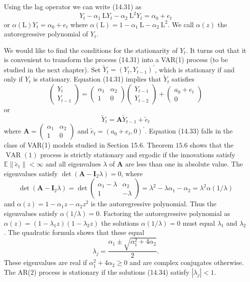 \documentclass[10pt]{article}
\begin{document}
Using the lag operator we can write (14.31) as
$$
Y_{t}-\alpha_{1} \mathrm{~L} Y_{t}-\alpha_{2} \mathrm{~L}^{2} Y_{t}=\alpha_{0}+e_{t}
$$
or $\alpha(\mathrm{L}) Y_{t}=\alpha_{0}+e_{t}$ where $\alpha(\mathrm{L})=1-\alpha_{1} \mathrm{~L}-\alpha_{2} \mathrm{~L}^{2}$. We call $\alpha(z)$ the autoregressive polynomial of $Y_{t}$.

We would like to find the conditions for the stationarity of $Y_{t}$. It turns out that it is convenient to transform the process (14.31) into a VAR(1) process (to be studied in the next chapter). Set $\widetilde{Y}_{t}=\left(Y_{t}, Y_{t-1}\right)^{\prime}$, which is stationary if and only if $Y_{t}$ is stationary. Equation (14.31) implies that $\widetilde{Y}_{t}$ satisfies
$$
\left(\begin{array}{c}
Y_{t} \\
Y_{t-1}
\end{array}\right)=\left(\begin{array}{cc}
\alpha_{1} & \alpha_{2} \\
1 & 0
\end{array}\right)\left(\begin{array}{c}
Y_{t-1} \\
Y_{t-2}
\end{array}\right)+\left(\begin{array}{c}
a_{0}+e_{t} \\
0
\end{array}\right)
$$
or
$$
\widetilde{Y}_{t}=\boldsymbol{A} \widetilde{Y}_{t-1}+\widetilde{e}_{t}
$$
where $\boldsymbol{A}=\left(\begin{array}{cc}\alpha_{1} & \alpha_{2} \\ 1 & 0\end{array}\right)$ and $\widetilde{e}_{t}=\left(a_{0}+e_{t}, 0\right)^{\prime}$. Equation (14.33) falls in the class of VAR(1) models studied in Section 15.6. Theorem $15.6$ shows that the $\operatorname{VAR}(1)$ process is strictly stationary and ergodic if the innovations satisfy $\mathbb{E}\left\|\widetilde{e}_{t}\right\|<\infty$ and all eigenvalues $\lambda$ of $\boldsymbol{A}$ are less than one in absolute value. The eigenvalues satisfy $\operatorname{det}\left(\boldsymbol{A}-\boldsymbol{I}_{2} \lambda\right)=0$, where
$$
\operatorname{det}\left(\boldsymbol{A}-\boldsymbol{I}_{2} \lambda\right)=\operatorname{det}\left(\begin{array}{cc}
\alpha_{1}-\lambda & \alpha_{2} \\
1 & -\lambda
\end{array}\right)=\lambda^{2}-\lambda \alpha_{1}-\alpha_{2}=\lambda^{2} \alpha(1 / \lambda)
$$
and $\alpha(z)=1-\alpha_{1} z-\alpha_{2} z^{2}$ is the autoregressive polynomial. Thus the eigenvalues satisfy $\alpha(1 / \lambda)=0$. Factoring the autoregressive polynomial as $\alpha(z)=\left(1-\lambda_{1} z\right)\left(1-\lambda_{2} z\right)$ the solutions $\alpha(1 / \lambda)=0$ must equal $\lambda_{1}$ and $\lambda_{2}$. The quadratic formula shows that these equal
$$
\lambda_{j}=\frac{\alpha_{1} \pm \sqrt{\alpha_{1}^{2}+4 \alpha_{2}}}{2} .
$$
These eigenvalues are real if $\alpha_{1}^{2}+4 \alpha_{2} \geq 0$ and are complex conjugates otherwise. The AR(2) process is stationary if the solutions (14.34) satisfy $\left|\lambda_{j}\right|<1$.
\end{document}
